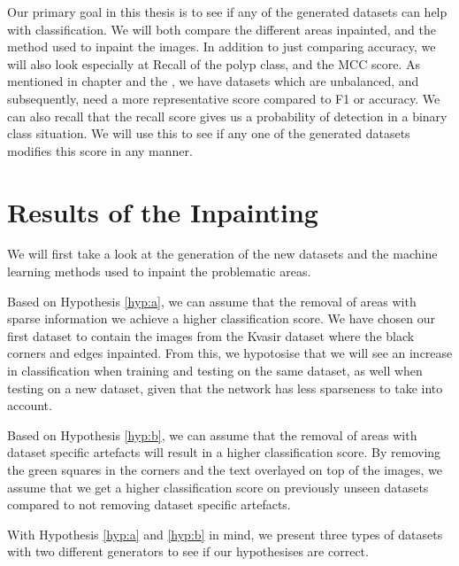 Our primary goal in this thesis is to see if any of the generated datasets can help with classification. We will both compare the different areas inpainted, and the method used to inpaint the images. 
In addition to just comparing accuracy, we will also look especially at Recall of the polyp class, and the MCC score. 
As mentioned in chapter  and the , we have datasets which are unbalanced, and subsequently, need a more representative score compared to F1 or accuracy. 
We can also recall that the recall score  gives us a  probability of detection in a binary class situation. We will use this to see if any one of the generated datasets modifies this score in any manner. 






\section{Results of the Inpainting}
We will first take a look at the generation of the new datasets and the machine learning methods used to inpaint the problematic areas.

Based on  Hypothesis \ref{hyp:a}, we can assume that the removal of areas with sparse information we achieve a higher classification score. We have chosen our first dataset to contain the images from the Kvasir dataset where the black corners and edges inpainted. 
From this, we hypotosise that we will see an increase in classification when training and testing on the same dataset, as well when testing on a new dataset, given that the network has less sparseness to take into account. 

Based on Hypothesis \ref{hyp:b}, we can assume that the removal of areas with dataset specific artefacts will result in a higher classification score.  By removing the green squares in the corners and the text overlayed on top of the images, we assume that we get a higher classification score on previously unseen datasets compared to not removing dataset specific artefacts.


With Hypothesis \ref{hyp:a} and \ref{hyp:b} in mind, we present three types of datasets with two different generators to see if our hypothesises are correct.




